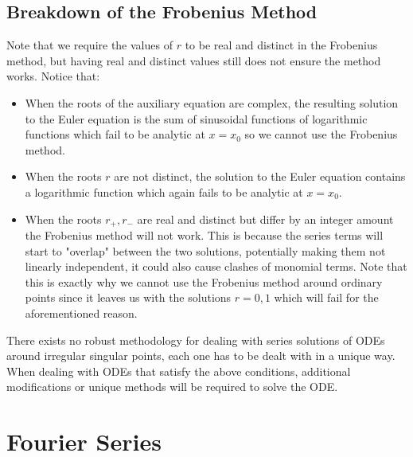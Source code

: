 \documentclass[12pt]{article}
\begin{document}
\subsection{Breakdown of the Frobenius Method}
Note that we require the values of \(r\) to be real and distinct in the Frobenius method, but having real and distinct values still does not ensure the method works. Notice that:
\begin{itemize}
    \item When the roots of the auxiliary equation are complex, the resulting solution to the Euler equation is the sum of sinusoidal functions of logarithmic functions which fail to be analytic at \(x=x_0\) so we cannot use the Frobenius method.
    \item When the roots \(r\) are not distinct, the solution to the Euler equation contains a logarithmic function which again fails to be analytic at \(x=x_0\).
    \item When the roots \(r_+,r_-\) are real and distinct but differ by an integer amount the Frobenius method will not work. This is because the series terms will start to "overlap" between the two solutions, potentially making them not linearly independent, it could also cause clashes of monomial terms. Note that this is exactly why we cannot use the Frobenius method around ordinary points since it leaves us with the solutions \(r=0,1\) which will fail for the aforementioned reason.
\end{itemize}
There exists no robust methodology for dealing with series solutions of ODEs around irregular singular points, each one has to be dealt with in a unique way. When dealing with ODEs that satisfy the above conditions, additional modifications or unique methods will be required to solve the ODE.
\clearpage
\section{Fourier Series}
\end{document}
